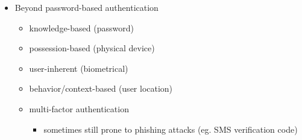 \documentclass[12pt,titlepage,a4paper]{report}
\begin{document}
\begin{itemize}
				\item Beyond password-based authentication
				\begin{itemize}
					\item knowledge-based (password)
					\item possession-based (physical device)
					\item user-inherent (biometrical)
					\item behavior/context-based (user location)
					\item multi-factor authentication
						\begin{itemize}
							\item sometimes still prone to phishing attacks (eg. SMS verification code)
						\end{itemize}
				\end{itemize}
			\end{itemize}
		
\end{document}
